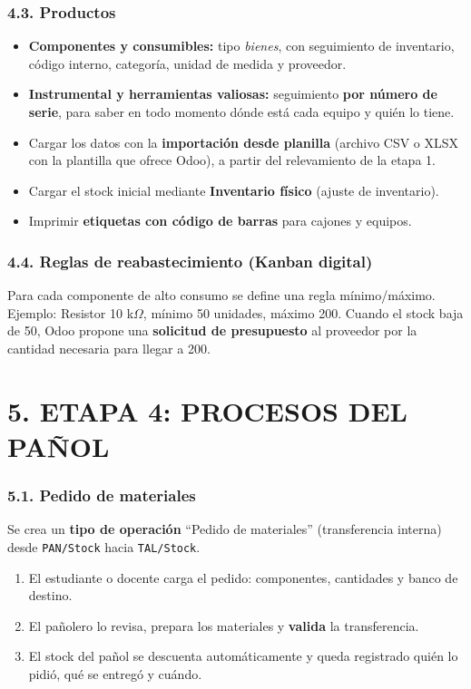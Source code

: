 \subsubsection*{4.3. Productos}
\begin{itemize}
  \item \textbf{Componentes y consumibles:} tipo \textit{bienes}, con seguimiento de inventario,
        código interno, categoría, unidad de medida y proveedor.
  \item \textbf{Instrumental y herramientas valiosas:} seguimiento \textbf{por número de
        serie}, para saber en todo momento dónde está cada equipo y quién lo tiene.
  \item Cargar los datos con la \textbf{importación desde planilla} (archivo CSV o XLSX con la
        plantilla que ofrece Odoo), a partir del relevamiento de la etapa 1.
  \item Cargar el stock inicial mediante \textbf{Inventario físico} (ajuste de inventario).
  \item Imprimir \textbf{etiquetas con código de barras} para cajones y equipos.
\end{itemize}

\subsubsection*{4.4. Reglas de reabastecimiento (Kanban digital)}
Para cada componente de alto consumo se define una regla mínimo/máximo. Ejemplo: Resistor 10
k$\Omega$, mínimo 50 unidades, máximo 200. Cuando el stock baja de 50, Odoo propone una
\textbf{solicitud de presupuesto} al proveedor por la cantidad necesaria para llegar a 200.

\section*{5. ETAPA 4: PROCESOS DEL PAÑOL}

\subsubsection*{5.1. Pedido de materiales}
Se crea un \textbf{tipo de operación} ``Pedido de materiales'' (transferencia interna) desde
\texttt{PAN/Stock} hacia \texttt{TAL/Stock}.
\begin{enumerate}
  \item El estudiante o docente carga el pedido: componentes, cantidades y banco de destino.
  \item El pañolero lo revisa, prepara los materiales y \textbf{valida} la transferencia.
  \item El stock del pañol se descuenta automáticamente y queda registrado quién lo pidió, qué
        se entregó y cuándo.
\end{enumerate}

